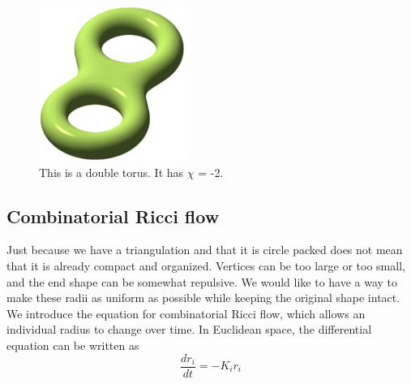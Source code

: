 \documentclass[12pt]{article}
\begin{document}
\begin{figure}
\includegraphics[scale = 2.0]{180px-Double_torus_illustration.png}
\caption{This is a double torus. It has $\chi$ = -2.}
\end{figure}

%  
  \subsection{Combinatorial Ricci flow}
  \maketitle  
Just because we have a triangulation and that it is circle packed does not mean that it is already compact and organized. Vertices can be too large or too small, and the end shape can be somewhat repulsive. We would like to have a way to make these radii as uniform as possible while keeping the original shape intact. We introduce the equation for combinatorial Ricci flow, which allows an individual radius to change over time. In Euclidean space, the differential equation can be written as 
  \begin{equation}
  \label{Riccif}
  \frac{dr_i}{{dt}} = -K_ir_i
  \end{equation}
  
\end{document}
